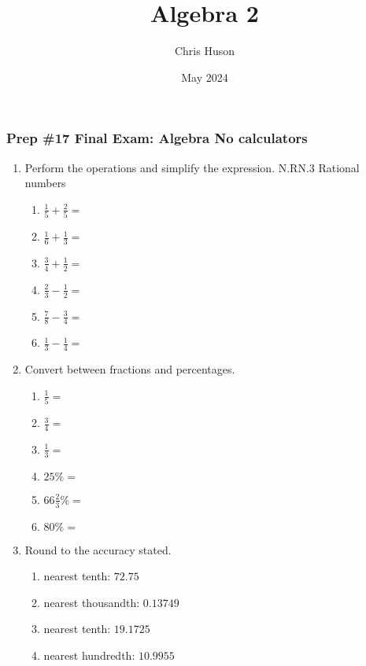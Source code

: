 \documentclass[12pt, twoside]{article}
\title{Algebra 2}
\author{Chris Huson}
\date{May 2024}
\begin{document}
\subsubsection*{Prep \#17 Final Exam: Algebra \hfill No calculators}
\begin{enumerate}[itemsep=0.5cm]

\item Perform the operations and simplify the expression. \hfill N.RN.3 Rational numbers
    \begin{multicols}{2}
    \begin{enumerate}[itemsep=0.5cm]
        \item $\displaystyle \frac{1}{5} + \frac{2}{5} =$
        \item $\displaystyle \frac{1}{6} + \frac{1}{3} =$
        \item $\displaystyle \frac{3}{4} + \frac{1}{2} =$
        \item $\displaystyle \frac{2}{3} - \frac{1}{2} =$
        \item $\displaystyle \frac{7}{8} - \frac{3}{4} =$
        \item $\displaystyle \frac{1}{3} - \frac{1}{4} =$
    \end{enumerate}
    \end{multicols}

\item Convert between fractions and percentages.
    \begin{multicols}{2}
    \begin{enumerate}[itemsep=0.5cm]
        \item $\frac{1}{5}=$
        \item $\frac{3}{4}=$
        \item $\frac{1}{3}=$
        \item $25\% =$
        \item $66 \frac{2}{3}\% =$
        \item $80\% =$
    \end{enumerate}
    \end{multicols}

\item Round to the accuracy stated.
    \begin{multicols}{2}
    \begin{enumerate}[itemsep=1cm]
        \item nearest tenth: $72.75$
        \item nearest thousandth: $0.13749$
        \item nearest tenth: $19.1725$
        \item nearest hundredth: $10.9955$
    \end{enumerate}
    \end{multicols} \vspace{0.5cm}


\end{enumerate}
\end{document}
